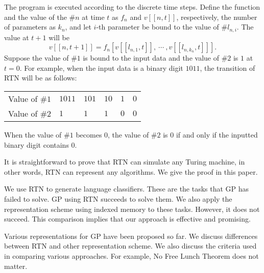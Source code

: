 \documentclass[9pt]{jsarticle}
\begin{document}
The program is executed according to the discrete time steps. Define the function and the value of the $\#n$ at time $t$ as $f_n$ and $v[[n, t]]$, respectively, the number of parameters as $k_n$, and let $i$-th parameter be bound to the value of $\#l_{n,i}$. The value at $t+1$ will be
\[
v[[n, t+1]]=f_n[v[[l_{n,1},t]],\ \cdots\ ,v[[l_{n,k_{n}},t]]].
\]
Suppose the value of $\#1$ is bound to the input data and the value of $\#2$ is $1$ at $t=0$. For example, when the input data is a binary digit $1011$, the transition of RTN will be as follows:
\begin{center}
\begin{tabular}{llllll}
Value of $\#1$ &$1011$ &$101$ &$10$ &$1$ &$0$\\
Value of $\#2$ &$1$    &$1$   &$1$  &$0$ &$0$
\end{tabular}
\end{center}
When the value of $\#1$ becomes $0$, the value of $\#2$ is $0$ if and only if the inputted binary digit contains $0$.

It is straightforward to prove that RTN can simulate any Turing machine, in other words, RTN can represent any algorithms. We give the proof in this paper.

We use RTN to generate language classifiers. These are the tasks that GP has failed to solve. GP using RTN succeeds to solve them. We also apply the representation scheme using indexed memory to these tasks. However, it does not succeed. This comparison implies that our approach is effective and promising.

Various representations for GP have been proposed so far. We discuss differences between RTN and other representation scheme. We also discuss the criteria used in comparing various approaches. For example, No Free Lunch Theorem does not matter.
\end{document}
